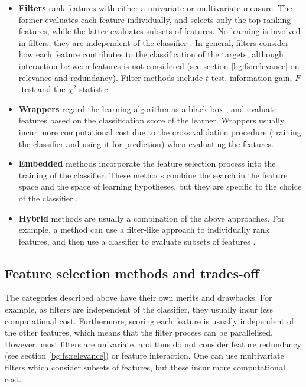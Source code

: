 \documentclass[12pt, twoside, a4paper]{report}
\begin{document}
\begin{itemize}
\item \textbf{Filters} rank features with either a univariate or multivariate measure. The former evaluates each feature individually, and selects only the top ranking features, while the latter evaluates subsets of features. No learning is involved in filters; they are independent of the classifier \cite{RefWorks:216}. In general, filters consider how each feature contributes to the classification of the targets, although interaction between features is not considered \cite{RefWorks:232} (see section \ref{bg:fs:relevance} on relevance and redundancy). Filter methods include $t$-test, information gain, $F$-test and the $\chi^2$-statistic.

\item \textbf{Wrappers} regard the learning algorithm as a black box \cite{RefWorks:140}, and evaluate features based on the classification score of the learner. Wrappers usually incur more computational cost due to the cross validation procedure (training the classifier and using it for prediction) when evaluating the features.

\item \textbf{Embedded} methods incorporate the feature selection process into the training of the classifier. These methods combine the search in the feature space and the space of learning hypotheses, but they are specific to the choice of the classifier \cite{RefWorks:118}.

\item \textbf{Hybrid} methods are usually a combination of the above approaches. For example, a method can use a filter-like approach to individually rank features, and then use a classifier to evaluate subsets of features \cite{RefWorks:140}.

\end{itemize}

\subsection{Feature selection methods and trades-off} \label{bg:fs:tradeoff}

The categories described above have their own merits and drawbacks. For example, as filters are independent of the classifier, they usually incur less computational cost. Furthermore, scoring each feature is usually independent of the other features, which means that the filter process can be parallelised. However, most filters are univariate, and thus do not consider feature redundancy (see section \ref{bg:fs:relevance}) or feature interaction. One can use multivariate filters which consider subsets of features, but these incur more computational cost.
\end{document}

